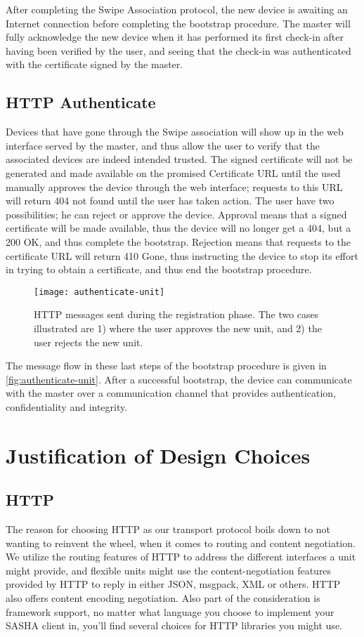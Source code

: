 After completing the Swipe Association protocol, the new device is awaiting an Internet connection before completing the bootstrap procedure. The master will fully acknowledge the new device when it has performed its first check-in after having been verified by the user, and seeing that the check-in was authenticated with the certificate signed by the master.

\subsection{HTTP Authenticate}
Devices that have gone through the Swipe association will show up in the web interface served by the master, and thus allow the user to verify that the associated devices are indeed intended trusted. The signed certificate will not be generated and made available on the promised Certificate URL until the used manually approves the device through the web interface; requests to this URL will return 404 not found until the user has taken action.
The user have two possibilities; he can reject or approve the device. Approval means that a signed certificate will be made available, thus the device will no longer get a 404, but a 200 OK, and thus complete the bootstrap. Rejection means that requests to the certificate URL will return 410 Gone, thus instructing the device to stop its effort in trying to obtain a certificate, and thus end the bootstrap procedure.

\begin{figure}[ht!]
    \centering
    \texttt{[image: authenticate-unit]}\label{fig:authenticate-unit}
    \caption{HTTP messages sent during the registration phase. The two cases illustrated are 1) where the user approves the new unit, and 2) the user rejects the new unit.}
\end{figure}

The message flow in these last steps of the bootstrap procedure is given in \autoref{fig:authenticate-unit}. After a successful bootstrap, the device can communicate with the master over a communication channel that provides authentication, confidentiality and integrity.
\section{Justification of Design Choices}

\subsection{HTTP}
The reason for choosing HTTP as our transport protocol boils down to not wanting to reinvent the wheel, when it comes to routing and content negotiation. We utilize the routing features of HTTP to address the different interfaces a unit might provide, and flexible units might use the content-negotiation features provided by HTTP to reply in either JSON, msgpack, XML or others. HTTP also offers content encoding negotiation. Also part of the consideration is framework support, no matter what language you choose to implement your SASHA client in, you'll find several choices for HTTP libraries you might use.

